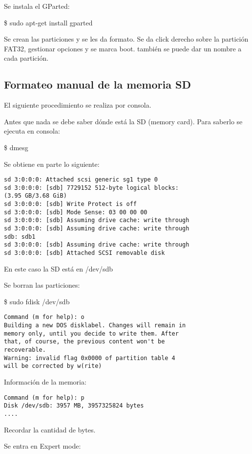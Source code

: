 Se instala el GParted:

\centerline{\$ sudo apt-get install gparted}

Se crean las particiones y se les da formato.
Se da click derecho sobre la partición FAT32, gestionar opciones y se marca boot. también se puede dar un nombre a cada partición.


\subsection{Formateo manual de la memoria SD}

El siguiente procedimiento se realiza por consola.

\bigskip
Antes que nada se debe saber dónde está la SD (memory card).
Para saberlo se ejecuta en consola: 

\centerline{\$ dmesg}

\bigskip
Se obtiene en parte lo siguiente: 
\begin{verbatim}
sd 3:0:0:0: Attached scsi generic sg1 type 0 
sd 3:0:0:0: [sdb] 7729152 512-byte logical blocks: 
(3.95 GB/3.68 GiB) 
sd 3:0:0:0: [sdb] Write Protect is off 
sd 3:0:0:0: [sdb] Mode Sense: 03 00 00 00 
sd 3:0:0:0: [sdb] Assuming drive cache: write through 
sd 3:0:0:0: [sdb] Assuming drive cache: write through 
sdb: sdb1 
sd 3:0:0:0: [sdb] Assuming drive cache: write through 
sd 3:0:0:0: [sdb] Attached SCSI removable disk 
\end{verbatim}

En este caso la SD está en /dev/sdb 

\bigskip
Se borran las particiones: 

\centerline{\$ sudo fdisk /dev/sdb}

\bigskip
\begin{verbatim}
Command (m for help): o 
Building a new DOS disklabel. Changes will remain in 
memory only, until you decide to write them. After 
that, of course, the previous content won't be 
recoverable. 
Warning: invalid flag 0x0000 of partition table 4 
will be corrected by w(rite) 
\end{verbatim}

Información de la memoria: 

\begin{verbatim}
Command (m for help): p 
Disk /dev/sdb: 3957 MB, 3957325824 bytes 
.... 
\end{verbatim}

Recordar la cantidad de bytes.

\bigskip
Se entra en Expert mode: 

